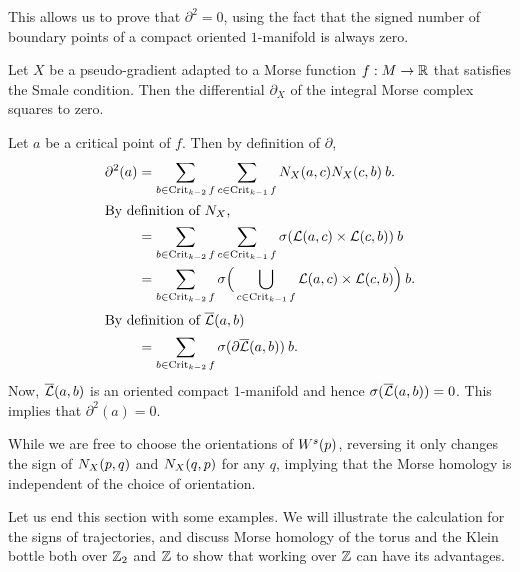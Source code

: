     This allows us to prove that $\partial^2 = 0$, using the fact that the signed number of boundary points of a compact oriented $1$-manifold is always zero.
    \begin{theorem}
        Let $X$ be a pseudo-gradient adapted to a Morse function  $f: M \to  \mathbb{R}$ that satisfies the Smale condition.
        Then the differential $\partial_X$ of the integral Morse complex squares to zero.
    \end{theorem}
    \begin{myproof}
        Let $a$ be a critical point of $f$.
        Then by definition of $\partial$,
        \begin{align*}
            \partial^2(a)
            &= 
            \sum_{b \in  \operatorname{Crit}_{k-2}f}
            \sum_{c \in  \operatorname{Crit}_{k-1}f}
            N_X(a, c) N_X(c, b) \: b.\\
            \shortintertext{By definition of $N_X$,}
            &= 
            \sum_{b \in  \operatorname{Crit}_{k-2}f}
            \sum_{c \in  \operatorname{Crit}_{k-1}f}
            \sigma(\mathcal L(a, c) \times \mathcal L(c, b) )\:  b\\
            &= 
            \sum_{b \in  \operatorname{Crit}_{k-2}f}
            \sigma\Big( \bigcup_{c \in  \operatorname{Crit}_{k-1}f}
            \mathcal L(a, c) \times \mathcal L(c, b) \Big)\:  b.\\
            \shortintertext{By definition of $\overline{\mathcal L}(a, b)$}
            &= \sum_{b \in  \operatorname{Crit}_{k-2}f} \sigma(\partial \overline{\mathcal L}(a, b))\:  b.
        \end{align*} 
        Now, $\overline{\mathcal L}(a, b)$ is an oriented compact  $1$-manifold and hence $\sigma(\overline{\mathcal L}(a, b)) = 0$.
        This implies that $\partial^2(a) = 0$.
    \end{myproof}
    \begin{remark}
        While we are free to choose the orientations of $W^s(p)$, reversing it only changes the sign of $N_{X}(p, q)$ and  $N_{X}(q, p)$ for any $q$, implying that the Morse homology is independent of the choice of orientation.
    \end{remark}


    Let us end this section with some examples.
    We will illustrate the calculation for the signs of trajectories, and discuss Morse homology of the torus and the Klein bottle both over $ \mathbb{Z}_2$ and $\mathbb{Z}$ to show that working over $ \mathbb{Z}$ can have its advantages.

